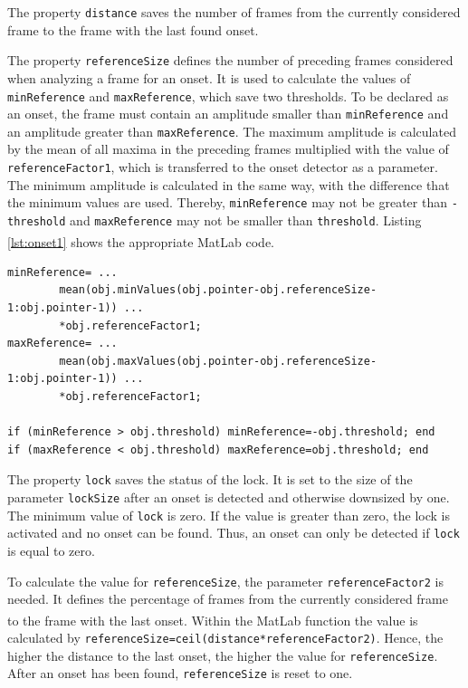 The property \lstinline{distance} saves the number of frames from the currently considered frame to the frame with the last found onset. 

The property \lstinline{referenceSize} defines the number of preceding frames considered when analyzing a frame for an onset. It is used to calculate the values of \lstinline{minReference} and \lstinline{maxReference}, which save two thresholds. To be declared as an onset, the frame must contain an amplitude smaller than \lstinline{minReference} and an amplitude greater than \lstinline{maxReference}. The maximum amplitude is calculated by the mean of all maxima in the preceding frames multiplied with the value of \lstinline{referenceFactor1}, which is transferred to the onset detector as a parameter. The minimum amplitude is calculated in the same way, with the difference that the minimum values are used. Thereby, \lstinline{minReference} may not be greater than \lstinline{-threshold} and \lstinline{maxReference} may not be smaller than \lstinline{threshold}. Listing \ref{lst:onset1} shows the appropriate MatLab\textsuperscript{\textregistered} code.

\begin{lstlisting}[caption={Calculation of minReference and maxReference},label={lst:onset1}]
minReference= ...
		mean(obj.minValues(obj.pointer-obj.referenceSize-1:obj.pointer-1)) ...
		*obj.referenceFactor1;
maxReference= ...
		mean(obj.maxValues(obj.pointer-obj.referenceSize-1:obj.pointer-1)) ...
		*obj.referenceFactor1;

if (minReference > obj.threshold) minReference=-obj.threshold; end
if (maxReference < obj.threshold) maxReference=obj.threshold; end  
\end{lstlisting}

The property \lstinline{lock} saves the status of the lock. It is set to the size of the parameter \lstinline{lockSize} after an onset is detected and otherwise downsized by one. The minimum value of \lstinline{lock} is zero. If the value is greater than zero, the lock is activated and no onset can be found. Thus, an onset can only be detected if \lstinline{lock} is equal to zero.   

To calculate the value for \lstinline{referenceSize}, the parameter \lstinline{referenceFactor2} is needed. It defines the percentage of frames from the currently considered frame to the frame with the last onset. Within the MatLab\textsuperscript{\textregistered} function the value is calculated by \lstinline{referenceSize=ceil(distance*referenceFactor2)}. Hence, the higher the distance to the last onset, the higher the value for \lstinline{referenceSize}. After an onset has been found, \lstinline{referenceSize} is reset to one.

